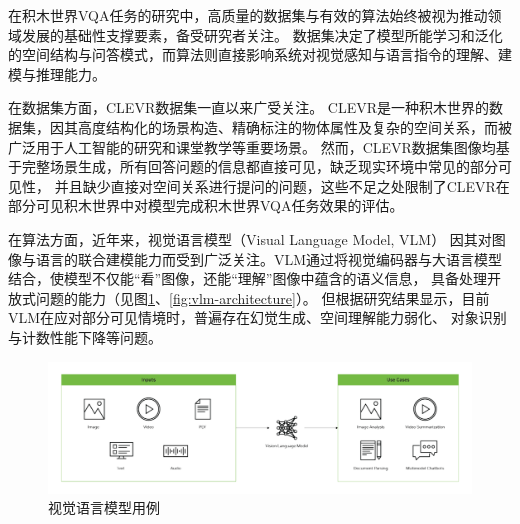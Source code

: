 在积木世界VQA任务的研究中，高质量的数据集与有效的算法始终被视为推动领域发展的基础性支撑要素，备受研究者关注。
数据集决定了模型所能学习和泛化的空间结构与问答模式，而算法则直接影响系统对视觉感知与语言指令的理解、建模与推理能力。

在数据集方面，CLEVR数据集一直以来广受关注。
CLEVR是一种积木世界的数据集，因其高度结构化的场景构造、精确标注的物体属性及复杂的空间关系，而被广泛用于人工智能的研究和课堂教学等重要场景。
然而，CLEVR数据集图像均基于完整场景生成，所有回答问题的信息都直接可见，缺乏现实环境中常见的部分可见性，
并且缺少直接对空间关系进行提问的问题，这些不足之处限制了CLEVR在部分可见积木世界中对模型完成积木世界VQA任务效果的评估\cite{sam-abraham-etal-2024-clevr}。

在算法方面，近年来，视觉语言模型（Visual Language Model, VLM）
因其对图像与语言的联合建模能力而受到广泛关注。VLM通过将视觉编码器与大语言模型结合，使模型不仅能“看”图像，还能“理解”图像中蕴含的语义信息，
具备处理开放式问题的能力（见图\ref{fig:vlm-example}、\ref{fig:vlm-architecture}）。
但根据研究结果显示，目前VLM在应对部分可见情境时，普遍存在幻觉生成、空间理解能力弱化、
对象识别与计数性能下降等问题\cite{vardi2025clipupclipbasedunanswerableproblem, chen2024spatialvlmendowingvisionlanguagemodels, campbell2024understandinglimitsvisionlanguage}。

\begin{figure}
    \centering
    \includegraphics[width=\textwidth]{figures/VLM-example.png}
    \caption{视觉语言模型用例}
    \label{fig:vlm-example}
\end{figure}

